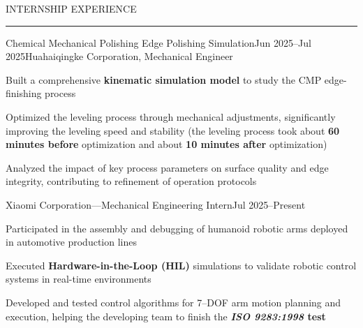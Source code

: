 \documentclass{resume} %
\renewenvironment{rSection}[1]{
\sectionskip
\textcolor{TsinghuaPurple}{\MakeUppercase{#1}}
\sectionlineskip
\hrule
\begin{list}{}{
\setlength{\leftmargin}{0em}
}
\item[]
}{
\end{list}
}
\begin{document}
\begin{rSection}{Internship Experience}

    \begin{rSubsection}{Chemical Mechanical Polishing Edge Polishing Simulation}{Jun 2025--Jul 2025}{Huahaiqingke Corporation, Mechanical Engineer}{}
    \item Built a comprehensive \textbf{kinematic simulation model} to study the CMP edge-finishing process
    \item Optimized the leveling process through mechanical adjustments, significantly improving the leveling speed and stability (the leveling process took about \textbf{60 minutes before} optimization and about \textbf{10 minutes after} optimization)
    \item Analyzed the impact of key process parameters on surface quality and edge integrity, contributing to refinement of operation protocols
    \end{rSubsection}
    
    \begin{rSubsection}{Xiaomi Corporation---Mechanical Engineering Intern}{Jul 2025--Present}{}{}
    \item Participated in the assembly and debugging of humanoid robotic arms deployed in automotive production lines
    \item Executed \textbf{Hardware-in-the-Loop (HIL)} simulations to validate robotic control systems in real-time environments
    \item Developed and tested control algorithms for 7--DOF arm motion planning and execution, helping the developing team to finish the \textbf{\textit{ISO 9283:1998} test}
    \end{rSubsection}
    
    \end{rSection}    


 
\end{document}
